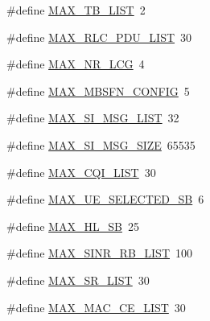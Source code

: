 \begin{DoxyCompactItemize}
\item 
\#define \hyperlink{ff-mac-common_8h_a245cfc4585a775f2729b9e9fbe44c37c}{M\+A\+X\+\_\+\+T\+B\+\_\+\+L\+I\+ST}~2
\item 
\#define \hyperlink{ff-mac-common_8h_a9a983cc34278906a566fcd7cb37eecbe}{M\+A\+X\+\_\+\+R\+L\+C\+\_\+\+P\+D\+U\+\_\+\+L\+I\+ST}~30
\item 
\#define \hyperlink{ff-mac-common_8h_afef351b90baca26062bd89215a68d3e3}{M\+A\+X\+\_\+\+N\+R\+\_\+\+L\+CG}~4
\item 
\#define \hyperlink{ff-mac-common_8h_ab1c578a0c6345009e07d8676b7cece31}{M\+A\+X\+\_\+\+M\+B\+S\+F\+N\+\_\+\+C\+O\+N\+F\+IG}~5
\item 
\#define \hyperlink{ff-mac-common_8h_a13cec4e600043212e40d496e6c71f32f}{M\+A\+X\+\_\+\+S\+I\+\_\+\+M\+S\+G\+\_\+\+L\+I\+ST}~32
\item 
\#define \hyperlink{ff-mac-common_8h_aec982f1c39494b7b3a21b901b6b7ed3c}{M\+A\+X\+\_\+\+S\+I\+\_\+\+M\+S\+G\+\_\+\+S\+I\+ZE}~65535
\item 
\#define \hyperlink{ff-mac-common_8h_a1628e4e53813eb25bbff39d5b76aeef4}{M\+A\+X\+\_\+\+C\+Q\+I\+\_\+\+L\+I\+ST}~30
\item 
\#define \hyperlink{ff-mac-common_8h_a254f4a0fb9eca7e6440dc8f725cdc12b}{M\+A\+X\+\_\+\+U\+E\+\_\+\+S\+E\+L\+E\+C\+T\+E\+D\+\_\+\+SB}~6
\item 
\#define \hyperlink{ff-mac-common_8h_a1d97e400874f9b13f70ad7818dee720d}{M\+A\+X\+\_\+\+H\+L\+\_\+\+SB}~25
\item 
\#define \hyperlink{ff-mac-common_8h_a89ef983f0d3e9ffda06a6f77c22f1d89}{M\+A\+X\+\_\+\+S\+I\+N\+R\+\_\+\+R\+B\+\_\+\+L\+I\+ST}~100
\item 
\#define \hyperlink{ff-mac-common_8h_a049bfdfd603ac3033a9a561ddc3f88bf}{M\+A\+X\+\_\+\+S\+R\+\_\+\+L\+I\+ST}~30
\item 
\#define \hyperlink{ff-mac-common_8h_ac8315156bdd0b73722b2e497bc2351c5}{M\+A\+X\+\_\+\+M\+A\+C\+\_\+\+C\+E\+\_\+\+L\+I\+ST}~30
\end{DoxyCompactItemize}

